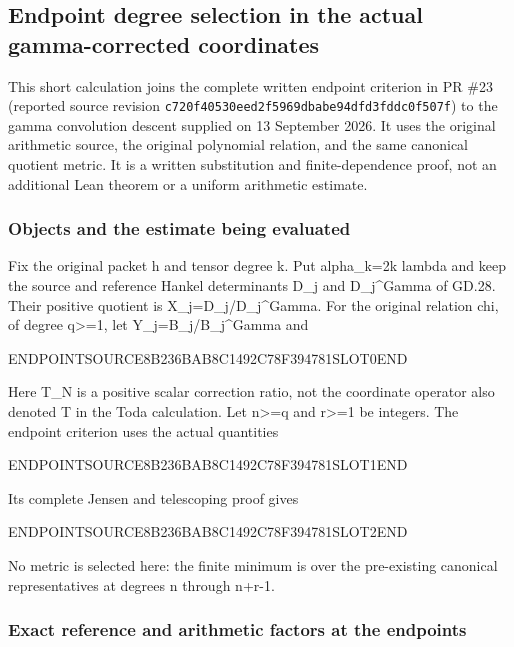 \subsection{Endpoint degree selection in the actual gamma-corrected coordinates}\label{endpoint-eg_original--endpoint-degree-selection-in-the-actual-gamma-corrected-coordinates}

This short calculation joins the complete written endpoint criterion in PR \#23 (reported source revision \texttt{c720f40530eed2f5969dbabe94dfd3fddc0f507f}) to the gamma convolution descent supplied on 13 September 2026. It uses the original arithmetic source, the original polynomial relation, and the same canonical quotient metric. It is a written substitution and finite-dependence proof, not an additional Lean theorem or a uniform arithmetic estimate.

\subsubsection{Objects and the estimate being evaluated}\label{endpoint-eg_original--objects-and-the-estimate-being-evaluated}

Fix the original packet h and tensor degree k. Put alpha\_k=2k lambda and keep the source and reference Hankel determinants D\_j and D\_j\^{}Gamma of GD.28. Their positive quotient is X\_j=D\_j/D\_j\^{}Gamma. For the original relation chi, of degree q\textgreater=1, let Y\_j=B\_j/B\_j\^{}Gamma and

ENDPOINTSOURCE8B236BAB8C1492C78F394781SLOT0END

Here T\_N is a positive scalar correction ratio, not the coordinate operator also denoted T in the Toda calculation. Let n\textgreater=q and r\textgreater=1 be integers. The endpoint criterion uses the actual quantities

ENDPOINTSOURCE8B236BAB8C1492C78F394781SLOT1END

Its complete Jensen and telescoping proof gives

ENDPOINTSOURCE8B236BAB8C1492C78F394781SLOT2END

No metric is selected here: the finite minimum is over the pre-existing canonical representatives at degrees n through n+r-1.

\subsubsection{Exact reference and arithmetic factors at the endpoints}\label{endpoint-eg_original--exact-reference-and-arithmetic-factors-at-the-endpoints}

